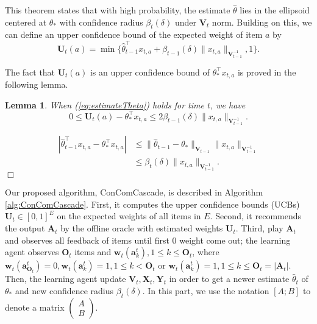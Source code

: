 \documentclass{article}
\newcommand{\bA}{\mathbf{A}}
\newcommand{\ba}{\mathbf{a}}
\newcommand{\bO}{\mathbf{O}}
\newcommand{\bU}{\mathbf{U}}
\newcommand{\bV}{\mathbf{V}}
\newcommand{\bw}{\mathbf{w}}
\newcommand{\bX}{\mathbf{X}}
\newcommand{\bY}{\mathbf{Y}}
\newcommand{\abs}[1]{\left| #1 \right|}
\newcommand{\norm}[1]{\| #1 \|}
\newtheorem{lemma}[theorem]{Lemma}%
\newenvironment{proof}{\noindent {\textbf{Proof. }}}{$\Box$ \medskip}
\begin{document}
This theorem states that with high probability, the estimate $\hat{\theta}$ lies in the ellipsoid centered at $\theta_*$  with confidence radius $\beta_t(\delta)$ under $\bV_t$ norm. Building on this, we can define an upper confidence bound of the expected weight of item $a$ by
\begin{equation}
\bU_t(a) = \min\{\hat{\theta}_{t-1}^{\top}x_{t,a} + \beta_{t-1}(\delta)\norm{x_{t,a}}_{\bV_{t-1}^{-1}}, 1\}.
\end{equation}

The fact that $\bU_t(a)$ is an upper confidence bound of $\theta_*^{\top}x_{t,a}$ is proved in the following lemma.
\begin{lemma}
\label{lem:estimateU}
When (\ref{eq:estimateTheta}) holds for time $t$, we have
$$
0 \leq \bU_t(a) - \theta_*^{\top}x_{t,a} \leq 2\beta_{t-1}(\delta)\norm{x_{t,a}}_{\bV_{t-1}^{-1}}.
$$
\end{lemma}
\begin{proof}
\begin{align*}
\abs{\hat{\theta}_{t-1}^{\top}x_{t,a} - \theta_*^{\top}x_{t,a}} &\leq \norm{\hat{\theta}_{t-1} - \theta_*}_{\bV_{t-1}} \norm{x_{t,a}}_{\bV_{t-1}^{-1}} \\
&\leq \beta_{t}(\delta)\norm{x_{t,a}}_{\bV_{t-1}^{-1}}.
\end{align*}
\end{proof}

Our proposed algorithm, ConComCascade, is described in Algorithm \ref{alg:ConComCascade}. First, it computes the upper confidence bounds (UCBs) $\bU_t \in [0,1]^{E}$ on the expected weights of all items in $E$. Second, it recommends the output $\bA_t$ by the offline oracle with estimated weights $\bU_t$. Third, play $\bA_t$ and observes all feedback of items until first $0$ weight come out; the learning agent observes $\bO_t$ items and $\bw_t(\ba_k^t), 1 \leq k \leq \bO_t$, where $\bw_t(\ba_{\bO_t}^t) = 0, \bw_t(\ba_k^t) = 1, 1 \leq k < \bO_t$ or $\bw_t(\ba_k^t) = 1, 1 \leq k \leq \bO_t = \abs{\bA_t}$. Then, the learning agent update $\bV_t, \bX_t, \bY_t$ in order to get a newer estimate $\hat{\theta}_t$ of $\theta_*$ and new confidence radius $\beta_t(\delta)$. In this part, we use the notation $[A; B]$ to denote a matrix $\begin{pmatrix} A\\ B\end{pmatrix}$.
\end{document}
